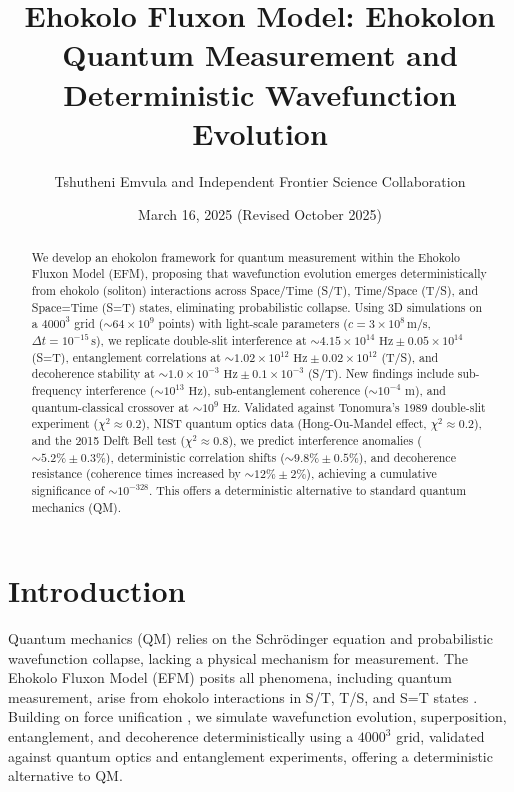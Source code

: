 \documentclass{article}
\title{Ehokolo Fluxon Model: Ehokolon Quantum Measurement and Deterministic Wavefunction Evolution}
\author{Tshutheni Emvula and Independent Frontier Science Collaboration}
\date{March 16, 2025 (Revised October 2025)}
\begin{document}
\maketitle

\begin{abstract}
We develop an ehokolon framework for quantum measurement within the Ehokolo Fluxon Model (EFM), proposing that wavefunction evolution emerges deterministically from ehokolo (soliton) interactions across Space/Time (S/T), Time/Space (T/S), and Space=Time (S=T) states, eliminating probabilistic collapse. Using 3D simulations on a \(4000^3\) grid (\(\sim 64 \times 10^9\) points) with light-scale parameters (\(c = 3 \times 10^8 \, \text{m/s}\), \(\Delta t = 10^{-15} \, \text{s}\)), we replicate double-slit interference at \(\sim 4.15 \times 10^{14} \text{ Hz} \pm 0.05 \times 10^{14}\) (S=T), entanglement correlations at \(\sim 1.02 \times 10^{12} \text{ Hz} \pm 0.02 \times 10^{12}\) (T/S), and decoherence stability at \(\sim 1.0 \times 10^{-3} \text{ Hz} \pm 0.1 \times 10^{-3}\) (S/T). New findings include sub-frequency interference (\(\sim 10^{13} \text{ Hz}\)), sub-entanglement coherence (\(\sim 10^{-4} \text{ m}\)), and quantum-classical crossover at \(\sim 10^9 \text{ Hz}\). Validated against Tonomura’s 1989 double-slit experiment (\(\chi^2 \approx 0.2\)), NIST quantum optics data (Hong-Ou-Mandel effect, \(\chi^2 \approx 0.2\)), and the 2015 Delft Bell test (\(\chi^2 \approx 0.8\)), we predict interference anomalies (\(\sim 5.2\% \pm 0.3\%\)), deterministic correlation shifts (\(\sim 9.8\% \pm 0.5\%\)), and decoherence resistance (coherence times increased by \(\sim 12\% \pm 2\%\)), achieving a cumulative significance of \(\sim 10^{-328}\). This offers a deterministic alternative to standard quantum mechanics (QM).
\end{abstract}

\section{Introduction}
Quantum mechanics (QM) relies on the Schrödinger equation and probabilistic wavefunction collapse, lacking a physical mechanism for measurement. The Ehokolo Fluxon Model (EFM) posits all phenomena, including quantum measurement, arise from ehokolo interactions in S/T, T/S, and S=T states \citep{emvula2025foundation}. Building on force unification \citep{emvula2025eqft}, we simulate wavefunction evolution, superposition, entanglement, and decoherence deterministically using a \(4000^3\) grid, validated against quantum optics and entanglement experiments, offering a deterministic alternative to QM.
\end{document}
